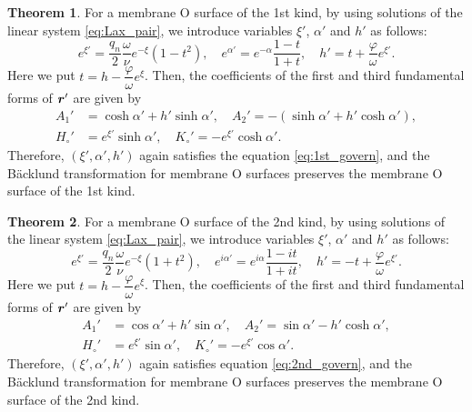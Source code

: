 \documentclass[a4paper]{amsart}
\def\br{\mbox{\boldmath $r$}}
\theoremstyle{definition}
\newtheorem{thm}{Theorem}[section]
\begin{document}
\begin{thm}
\label{thm:main2_1st}
For a membrane O surface of the 1st kind, by using solutions of the linear system \eqref{eq:Lax_pair}, we introduce variables $\xi'$, $\alpha'$ and $h'$ as follows:
\begin{equation}
e^{\xi'} = \frac{q_n}{2} \frac{\omega}{\nu} e^{-\xi} (1-t^2), \quad
e^{\alpha'} = e^{-\alpha} \frac{1-t}{1+t}, \quad
h' = t + \frac{\varphi}{\omega} e^{\xi'}.
\end{equation}
Here we put $t = h - \dfrac{\varphi}{\omega} e^\xi$.
Then, the coefficients of the first and third fundamental forms of $\br'$ are given by
\begin{equation}
\begin{aligned}
A_1' &= \cosh \alpha' + h' \sinh \alpha', \quad
A_2' = - (\sinh \alpha' + h' \cosh \alpha'),\\
H_\circ' &= e^{\xi'} \sinh \alpha', \quad
K_\circ' = - e^{\xi'} \cosh \alpha'.
\end{aligned}
\end{equation}
Therefore, $(\xi', \alpha', h')$ again satisfies the equation \eqref{eq:1st_govern}, and the B\"acklund transformation for membrane O surfaces preserves the membrane O surface of the 1st kind.
\end{thm}
%
\begin{thm}
\label{thm:main2_2nd}
For a membrane O surface of the 2nd kind, by using solutions of the linear system \eqref{eq:Lax_pair}, we introduce variables $\xi'$, $\alpha'$ and $h'$ as follows:
\begin{equation}
e^{\xi'} = \frac{q_n}{2} \frac{\omega}{\nu} e^{-\xi} (1+t^2), \quad
e^{i\alpha'} = e^{i\alpha} \frac{1-it}{1+it}, \quad
h' = -t + \frac{\varphi}{\omega}e^{\xi'}.
\end{equation}
Here we put $t = h - \dfrac{\varphi}{\omega} e^\xi$.
Then, the coefficients of the first and third fundamental forms of $\br'$ are given by
\begin{equation}
\begin{aligned}
A_1' &= \cos \alpha' + h' \sin \alpha', \quad
A_2' = \sin \alpha' - h' \cosh \alpha',\\
H_\circ' &= e^{\xi'} \sin \alpha', \quad
K_\circ' = - e^{\xi'} \cos \alpha'.
\end{aligned}
\end{equation}
Therefore, $(\xi', \alpha', h')$ again satisfies equation \eqref{eq:2nd_govern}, and the B\"acklund transformation for membrane O surfaces preserves the membrane O surface of the 2nd kind.
\end{thm}
\end{document}
